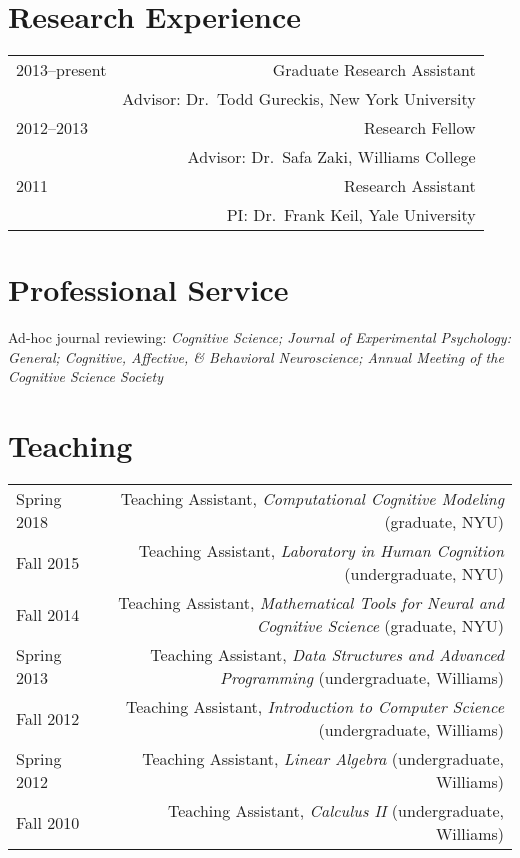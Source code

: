 \documentclass[12pt]{my_cv}
\begin{document}
\section{Research Experience}
\begin{tabular}{L R}
2013--present& Graduate Research Assistant\\
&Advisor: Dr.\ Todd Gureckis, New York University\\[1ex]
2012--2013& Research Fellow\\
&Advisor: Dr.\ Safa Zaki, Williams College\\[1ex]
2011&Research Assistant\\
&PI: Dr.\ Frank Keil, Yale University\\
\end{tabular}

\section{Professional Service}

Ad-hoc journal reviewing: \emph{Cognitive Science; Journal of Experimental
  Psychology: General; Cognitive, Affective, \& Behavioral Neuroscience;
  Annual Meeting of the Cognitive Science Society}

\section{Teaching}
\begin{tabular}{L R}
Spring 2018 & Teaching Assistant, \emph{Computational Cognitive Modeling} (graduate, NYU)\\ [0.5ex]
Fall 2015 & Teaching Assistant, \emph{Laboratory in Human Cognition} (undergraduate, NYU)\\ [0.5ex]
Fall 2014&Teaching Assistant, \emph{Mathematical Tools for Neural and Cognitive Science} (graduate, NYU)\\ [0.5ex]
Spring 2013&Teaching Assistant, \emph{Data Structures and Advanced Programming} (undergraduate, Williams)\\[0.5ex]
Fall 2012&Teaching Assistant, \emph{Introduction to Computer Science} (undergraduate, Williams)\\[0.5ex]
Spring 2012&Teaching Assistant, \emph{Linear Algebra} (undergraduate, Williams)\\[0.5ex]
Fall 2010&Teaching Assistant, \emph{Calculus II} (undergraduate, Williams)\\[0.5ex]
\end{tabular}
\end{document}
